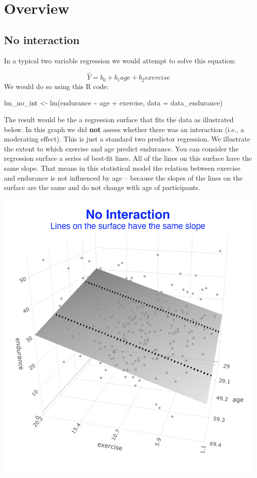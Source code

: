 \documentclass[
]{krantz}
\makeatletter
\newenvironment{Shaded}{\begin{snugshade}}{\end{snugshade}}
\newcommand{\AttributeTok}[1]{\textcolor[rgb]{0.61,0.61,0.61}{#1}}
\newcommand{\FunctionTok}[1]{\textcolor[rgb]{0,0,0}{#1}}
\newcommand{\NormalTok}[1]{#1}
\newcommand{\OtherTok}[1]{\textcolor[rgb]{0.37,0.37,0.37}{#1}}
\newcommand{\SpecialCharTok}[1]{\textcolor[rgb]{0,0,0}{#1}}
\newenvironment{kframe}{%
\medskip{}
\setlength{\fboxsep}{.8em}
 \def\at@end@of@kframe{}%
 \ifinner\ifhmode%
  \def\at@end@of@kframe{\end{minipage}}%
  \begin{minipage}{\columnwidth}%
 \fi\fi%
 \def\FrameCommand##1{\hskip\@totalleftmargin \hskip-\fboxsep
 \colorbox{shadecolor}{##1}\hskip-\fboxsep
     \hskip-\linewidth \hskip-\@totalleftmargin \hskip\columnwidth}%
 \MakeFramed {\advance\hsize-\width
   \@totalleftmargin\z@ \linewidth\hsize
   \@setminipage}}%
 {\par\unskip\endMakeFramed%
 \at@end@of@kframe}
\renewenvironment{Shaded}{\begin{kframe}}{\end{kframe}}
\makeatother
\begin{document}
\hypertarget{overview-8}{%
\section{Overview}\label{overview-8}}

\hypertarget{no-interaction}{%
\subsection{No interaction}\label{no-interaction}}

In a typical two variable regression we would attempt to solve this equation:

\[ \hat{Y} = b_0 + b_1age + b_2exercise \]
We would do so using this R code:

\begin{Shaded}
\begin{Highlighting}[]
\NormalTok{lm\_no\_int }\OtherTok{\textless{}{-}} \FunctionTok{lm}\NormalTok{(endurance }\SpecialCharTok{\textasciitilde{}}\NormalTok{ age }\SpecialCharTok{+}\NormalTok{ exercise,}
                \AttributeTok{data =}\NormalTok{ data\_endurance)}
\end{Highlighting}
\end{Shaded}

The result would be the a regression surface that fits the data as illustrated below. In this graph we did \textbf{not} assess whether there was an interaction (i.e., a moderating effect). This is just a standard two predictor regression. We illustrate the extent to which exercise and age predict endurance. You can consider the regression surface a series of best-fit lines. All of the lines on this surface have the same slope. That means in this statistical model the relation between exercise and endurance is not influenced by age -- because the slopes of the lines on the surface are the same and do not change with age of participants.

\includegraphics[width=0.35\linewidth]{ch_mmr/images/mmr_no_int}
\end{document}
